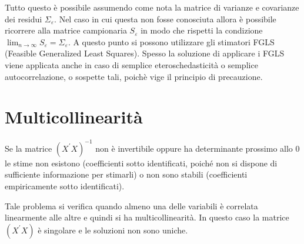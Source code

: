 \documentclass[a4page, 11pt]{article} %
\begin{document}
Tutto questo è possibile assumendo come nota la matrice di varianze e covarianze dei residui $\Sigma_\varepsilon$. Nel caso in cui questa non fosse conosciuta allora è possibile ricorrere alla matrice campionaria $S_\varepsilon$ in modo che rispetti la condizione $\lim_{n\to \infty}{S_\varepsilon = \Sigma_\varepsilon}$. A questo punto si possono utilizzare gli stimatori FGLS (Feasible Generalized Least Squares). Spesso la soluzione di applicare i FGLS viene applicata anche in caso di semplice eteroschedasticità o semplice autocorrelazione, o sospette tali, poichè vige il principio di precauzione.

\section{Multicollinearità }

Se la matrice $(X^{\prime} X)^{-1}$ non è invertibile oppure ha determinante prossimo allo 0 le stime non esistono (coefficienti sotto identificati, poiché non si dispone di sufficiente informazione per stimarli) o non sono stabili (coefficienti empiricamente sotto identificati).

Tale problema si verifica quando almeno una delle variabili è correlata linearmente alle altre e quindi si ha multicollinearità. In questo caso la matrice $(X^{\prime} X)$ è singolare e le soluzioni non sono uniche. 
\end{document}
